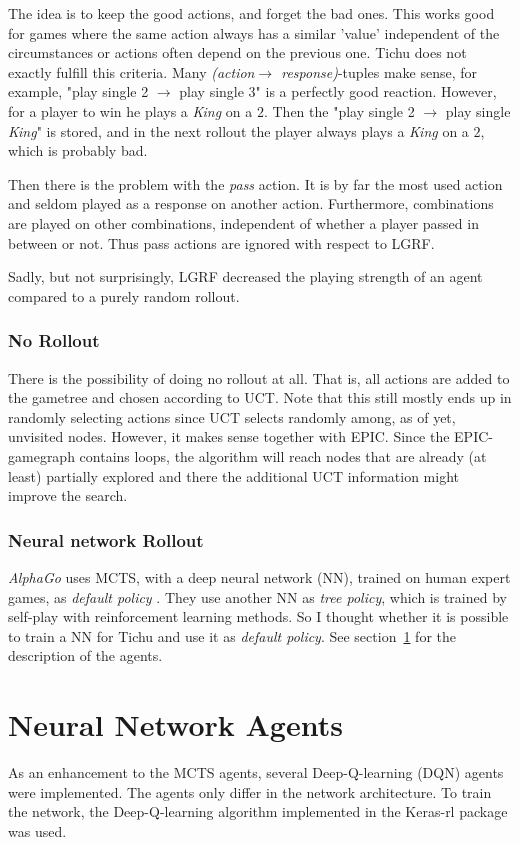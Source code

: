 The idea is to keep the good actions, and forget the bad ones. This works good for games where the same action always has a similar 'value' independent of the circumstances or actions often depend on the previous one. Tichu does not exactly fulfill this criteria. Many \textit{(action$\rightarrow$ response)}-tuples make sense, for example, "play single 2 $\rightarrow$ play single 3" is a perfectly good reaction. However, for a player to win he plays a \textit{King} on a $2$. Then the "play single 2 $\rightarrow$ play single \textit{King}" is stored, and in the next rollout the player always plays a \textit{King} on a $2$, which is probably bad.

Then there is the problem with the \textit{pass} action. It is by far the most used action and seldom played as a response on another action. Furthermore, combinations are played on other combinations, independent of whether a player passed in between or not. Thus pass actions are ignored with respect to LGRF.

Sadly, but not surprisingly, LGRF decreased the playing strength of an agent compared to a purely random rollout.

\subsubsection{No Rollout}
There is the possibility of doing no rollout at all. That is, all actions are added to the gametree and chosen according to UCT. Note that this still mostly ends up in randomly selecting actions since UCT selects randomly among, as of yet, unvisited nodes. However, it makes sense together with EPIC. Since the EPIC-gamegraph contains loops, the algorithm will reach nodes that are already (at least) partially explored and there the additional UCT information might improve the search.

\subsubsection{Neural network Rollout}
\textit{AlphaGo} uses MCTS, with a deep neural network (NN), trained on human expert games, as \textit{default policy} \cite{alphago}. They use another NN as \textit{tree policy}, which is trained by self-play with reinforcement learning methods.
So I thought whether it is possible to train a NN for Tichu and use it as \textit{default policy}. See section~\ref{sec:nn_agents} for the description of the agents.


\section{Neural Network Agents}
\label{sec:nn_agents}
As an enhancement to the MCTS agents, several Deep-Q-learning (DQN) agents were implemented.
The agents only differ in the network architecture. To train the network, the Deep-Q-learning algorithm implemented in the Keras-rl package\cite{kerasrl} was used.

